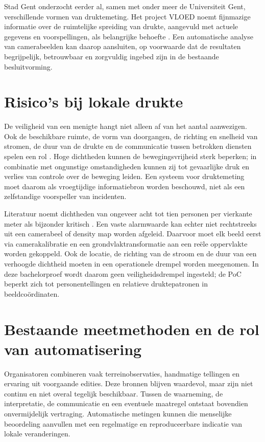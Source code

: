 Stad Gent onderzocht eerder al, samen met onder meer de Universiteit Gent, verschillende vormen van druktemeting. Het project VLOED noemt fijnmazige informatie over de ruimtelijke spreiding van drukte, aangevuld met actuele gegevens en voorspellingen, als belangrijke behoefte \autocite{StadGentVloed}. Een automatische analyse van camerabeelden kan daarop aansluiten, op voorwaarde dat de resultaten begrijpelijk, betrouwbaar en zorgvuldig ingebed zijn in de bestaande besluitvorming.

\section{Risico's bij lokale drukte}

De veiligheid van een menigte hangt niet alleen af van het aantal aanwezigen. Ook de beschikbare ruimte, de vorm van doorgangen, de richting en snelheid van stromen, de duur van de drukte en de communicatie tussen betrokken diensten spelen een rol \autocite{Helbing2000,Zeitz2009,Hutton2025}. Hoge dichtheden kunnen de bewegingsvrijheid sterk beperken; in combinatie met ongunstige omstandigheden kunnen zij tot gevaarlijke druk en verlies van controle over de beweging leiden. Een systeem voor druktemeting moet daarom als vroegtijdige informatiebron worden beschouwd, niet als een zelfstandige voorspeller van incidenten.

Literatuur noemt dichtheden van ongeveer acht tot tien personen per vierkante meter als bijzonder kritisch \autocite{Haghani2022}. Een vaste alarmwaarde kan echter niet rechtstreeks uit een camerabeel of density map worden afgeleid. Daarvoor moet elk beeld eerst via camerakalibratie en een grondvlaktransformatie aan een reële oppervlakte worden gekoppeld. Ook de locatie, de richting van de stroom en de duur van een verhoogde dichtheid moeten in een operationele drempel worden meegenomen. In deze bachelorproef wordt daarom geen veiligheidsdrempel ingesteld; de PoC beperkt zich tot personentellingen en relatieve druktepatronen in beeldcoördinaten.

\section{Bestaande meetmethoden en de rol van automatisering}

Organisatoren combineren vaak terreinobservaties, handmatige tellingen en ervaring uit voorgaande edities. Deze bronnen blijven waardevol, maar zijn niet continu en niet overal tegelijk beschikbaar. Tussen de waarneming, de interpretatie, de communicatie en een eventuele maatregel ontstaat bovendien onvermijdelijk vertraging. Automatische metingen kunnen die menselijke beoordeling aanvullen met een regelmatige en reproduceerbare indicatie van lokale veranderingen.

